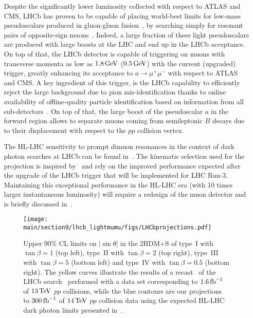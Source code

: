 Despite the significantly lower luminosity collected with respect to ATLAS and CMS, LHCb has proven to be capable of placing world-best limits for low-mass pseudoscalars produced in gluon-gluon fusion~\cite{Haisch:2016hzu,Haisch:2018kqx}, by searching simply for resonant pairs of opposite-sign muons~\cite{Aaij:2017rft, Aaij:2018xpt}. Indeed, a large fraction of these light pseudoscalars are produced with large boosts at the LHC and end up in the LHCb acceptance. On top of that, the LHCb detector is capable of triggering on muons with transverse momenta as low as $1.8 \, {\rm GeV}$ ($0.5 \, {\rm GeV}$) with the current (upgraded) trigger, greatly enhancing its acceptance to $a\to\mu^+\mu^-$ with respect to ATLAS and CMS. A key ingredient of this trigger, is the LHCb capability to efficiently reject  the large background due to pion mis-identification thanks to online availability of offline-quality particle identification based on information from all sub-detectors~\cite{Aaij:2016rxn, Dujany:2015lxd}. On top of that, the large boost of the pseudoscalar $a$  in the forward region allows to separate muons coming from semileptonic $B$ decays due to their displacement with respect to the $pp$ collision vertex. 

The HL-LHC sensitivity to prompt dimuon resonances in the context of dark photon searches at LHCb can be found in~\cite{Bediaga:2018lhg}. The kinematic selection used for the projection is inspired by~\cite{Ilten:2016tkc} and rely on the improved performance expected after the upgrade of the LHCb trigger that will be implemented for LHC Run-3. Maintaining this exceptional performance in the HL-LHC era (\ie with 10 times larger instantaneous luminosity) will require a redesign of the muon detector and is briefly discussed in~\cite{Bediaga:2018lhg}.

\begin{figure}[ht!]
\centering
\texttt{[image: \\main/section9/lhcb\_lightmumu/figs/LHCbprojections.pdf]}
\vspace{2mm}
\caption{Upper $90\%$ CL limits on $|\!\sin\theta|$ in the 2HDM+S of type~I with $\tan\beta =1$ (top left), type~II with $\tan\beta =2$ (top right), type~III with $\tan\beta = 5$ (bottom left) and type~IV with $\tan\beta = 0.5$ (bottom right). The yellow curves illustrate the results of a recast~\cite{Haisch:2018kqx} of the LHCb search~\cite{Aaij:2017rft} performed with a data set corresponding to $1.6\, {\rm fb}^{-1}$ of $13 \, {\rm TeV}$ $pp$ collisions, while the blue contours are our projections to $300 \, {\rm fb}^{-1}$ of $14 \, {\rm TeV}$ $pp$ collision data using the expected HL-LHC dark photon limits presented in~\cite{Bediaga:2018lhg}. }\label{fig:lhcb_lightmumu}
\end{figure}

